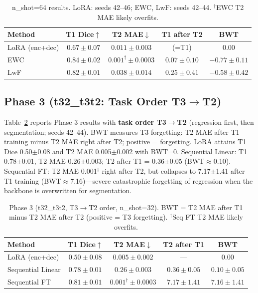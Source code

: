 \documentclass[journal,twoside,web]{ieeecolor}
\begin{document}
\begin{table}[t]
\caption{n\_shot=64 results. LoRA: seeds 42--46; EWC, LwF: seeds 42--44. $^\dagger$EWC T2 MAE likely overfits.}
\label{tab:shot64}
\centering
\begin{tabular}{lcccc}
\toprule
Method & T1 Dice$\uparrow$ & T2 MAE$\downarrow$ & T1 after T2 & BWT \\
\midrule
LoRA (enc+dec) & $0.67 \pm 0.07$ & $0.011 \pm 0.003$ & (=T1) & $\mathbf{0.00}$ \\
EWC & $0.84 \pm 0.02$ & $0.001^\dagger \pm 0.0003$ & $0.07 \pm 0.10$ & $-0.77 \pm 0.11$ \\
LwF & $0.82 \pm 0.01$ & $0.038 \pm 0.014$ & $0.25 \pm 0.41$ & $-0.58 \pm 0.42$ \\
\bottomrule
\end{tabular}
\end{table}

\subsection{Phase 3 (t32\_t3t2: Task Order T3$\to$T2)}
\label{sec:t32}

Table~\ref{tab:t32} reports Phase 3 results with \textbf{task order T3$\to$T2} (regression first, then segmentation; seeds 42--44). BWT measures T3 forgetting: T2 MAE after T1 training minus T2 MAE right after T2; positive = forgetting. LoRA attains T1 Dice 0.50$\pm$0.08 and T2 MAE 0.005$\pm$0.002 with BWT=0. Sequential Linear: T1 0.78$\pm$0.01, T2 MAE 0.26$\pm$0.003; T2 after T1 = 0.36$\pm$0.05 (BWT$\approx$0.10). Sequential FT: T2 MAE 0.001$^\dagger$ right after T2, but collapses to 7.17$\pm$1.41 after T1 training (BWT$\approx$7.16)---severe catastrophic forgetting of regression when the backbone is overwritten for segmentation.

\begin{table}[t]
\caption{Phase 3 (t32\_t3t2, T3$\to$T2 order, n\_shot=32). BWT = T2 MAE after T1 minus T2 MAE after T2 (positive = T3 forgetting). $^\dagger$Seq FT T2 MAE likely overfits.}
\label{tab:t32}
\centering
\begin{tabular}{lcccc}
\toprule
Method & T1 Dice$\uparrow$ & T2 MAE$\downarrow$ & T2 after T1 & BWT \\
\midrule
LoRA (enc+dec) & $0.50 \pm 0.08$ & $0.005 \pm 0.002$ & --- & $\mathbf{0.00}$ \\
Sequential Linear & $0.78 \pm 0.01$ & $0.26 \pm 0.003$ & $0.36 \pm 0.05$ & $0.10 \pm 0.05$ \\
Sequential FT & $0.81 \pm 0.01$ & $0.001^\dagger \pm 0.0003$ & $7.17 \pm 1.41$ & $7.16 \pm 1.41$ \\
\bottomrule
\end{tabular}
\end{table}
\end{document}
